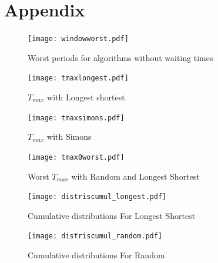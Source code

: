 \documentclass[a4paper,10pt]{report}
\begin{document}
\chapter*{Appendix}

 
\begin{figure}[H]
\hspace*{-3cm}
\centering
\texttt{[image: windowworst.pdf]}%
\caption{Worst periods for algorithms without waiting times}
\end{figure}

\begin{figure}[H]
\hspace*{-3cm}
\centering
\texttt{[image: tmaxlongest.pdf]}%
\caption{$T_{max}$ with Longest shortest}
\end{figure}

\begin{figure}[H]
\hspace*{-3cm}
\centering
\texttt{[image: tmaxsimons.pdf]}%
\caption{$T_{max}$ with Simons}
\end{figure}


\begin{figure}[H]
\hspace*{-3cm}
\centering
\texttt{[image: tmax0worst.pdf]}%
\caption{Worst $T_{max}$ with Random and Longest Shortest}
\end{figure}


\begin{figure}[H]
\hspace*{-3cm}
\centering
\texttt{[image: distriscumul\_longest.pdf]}%
\caption{Cumulative distributions For Longest Shortest}
\end{figure}

\begin{figure}[H]
\hspace*{-3cm}
\centering
\texttt{[image: distriscumul\_random.pdf]}%
\caption{Cumulative distributions For Random}
\end{figure}




\end{document}
